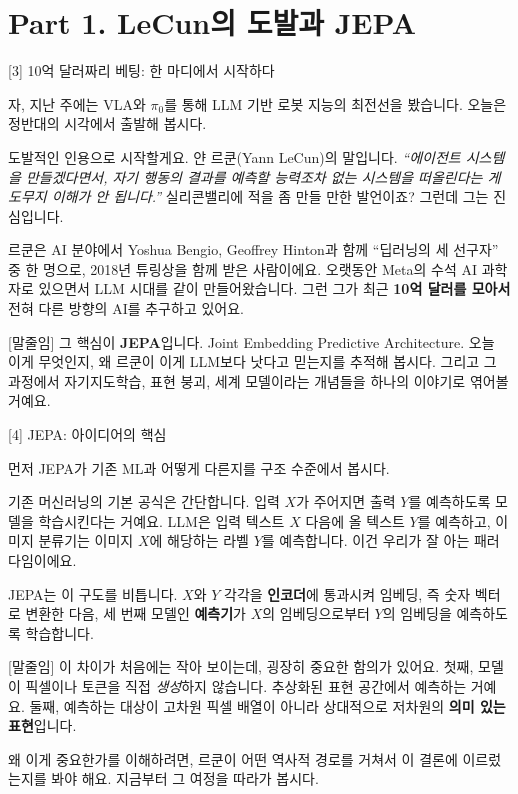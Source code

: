 \documentclass[aspectratio=169,10pt]{beamer}
\newenvironment{script}{%
  \footnotesize
  \setlength{\parskip}{0.5em}
  \setlength{\parindent}{0pt}
}{}
\begin{document}
\section{Part 1. LeCun의 도발과 JEPA}

\begin{frame}{[3] 10억 달러짜리 베팅: 한 마디에서 시작하다}
\begin{script}
자, 지난 주에는 VLA와 $\pi_0$를 통해 LLM 기반 로봇 지능의 최전선을 봤습니다. 오늘은 정반대의 시각에서 출발해 봅시다.

도발적인 인용으로 시작할게요. 얀 르쿤(Yann LeCun)의 말입니다. \textit{``에이전트 시스템을 만들겠다면서, 자기 행동의 결과를 예측할 능력조차 없는 시스템을 떠올린다는 게 도무지 이해가 안 됩니다.''} 실리콘밸리에 적을 좀 만들 만한 발언이죠? 그런데 그는 진심입니다.

르쿤은 AI 분야에서 Yoshua Bengio, Geoffrey Hinton과 함께 ``딥러닝의 세 선구자'' 중 한 명으로, 2018년 튜링상을 함께 받은 사람이에요. 오랫동안 Meta의 수석 AI 과학자로 있으면서 LLM 시대를 같이 만들어왔습니다. 그런 그가 최근 \textbf{10억 달러를 모아서} 전혀 다른 방향의 AI를 추구하고 있어요.

[말줄임] 그 핵심이 \textbf{JEPA}입니다. Joint Embedding Predictive Architecture. 오늘 이게 무엇인지, 왜 르쿤이 이게 LLM보다 낫다고 믿는지를 추적해 봅시다. 그리고 그 과정에서 자기지도학습, 표현 붕괴, 세계 모델이라는 개념들을 하나의 이야기로 엮어볼 거예요.
\end{script}
\end{frame}

\begin{frame}{[4] JEPA: 아이디어의 핵심}
\begin{script}
먼저 JEPA가 기존 ML과 어떻게 다른지를 구조 수준에서 봅시다.

기존 머신러닝의 기본 공식은 간단합니다. 입력 $X$가 주어지면 출력 $Y$를 예측하도록 모델을 학습시킨다는 거예요. LLM은 입력 텍스트 $X$ 다음에 올 텍스트 $Y$를 예측하고, 이미지 분류기는 이미지 $X$에 해당하는 라벨 $Y$를 예측합니다. 이건 우리가 잘 아는 패러다임이에요.

JEPA는 이 구도를 비틉니다. $X$와 $Y$ 각각을 \textbf{인코더}에 통과시켜 임베딩, 즉 숫자 벡터로 변환한 다음, 세 번째 모델인 \textbf{예측기}가 $X$의 임베딩으로부터 $Y$의 임베딩을 예측하도록 학습합니다.

[말줄임] 이 차이가 처음에는 작아 보이는데, 굉장히 중요한 함의가 있어요. 첫째, 모델이 픽셀이나 토큰을 직접 \emph{생성}하지 않습니다. 추상화된 표현 공간에서 예측하는 거예요. 둘째, 예측하는 대상이 고차원 픽셀 배열이 아니라 상대적으로 저차원의 \textbf{의미 있는 표현}입니다.

왜 이게 중요한가를 이해하려면, 르쿤이 어떤 역사적 경로를 거쳐서 이 결론에 이르렀는지를 봐야 해요. 지금부터 그 여정을 따라가 봅시다.
\end{script}
\end{frame}
\end{document}
